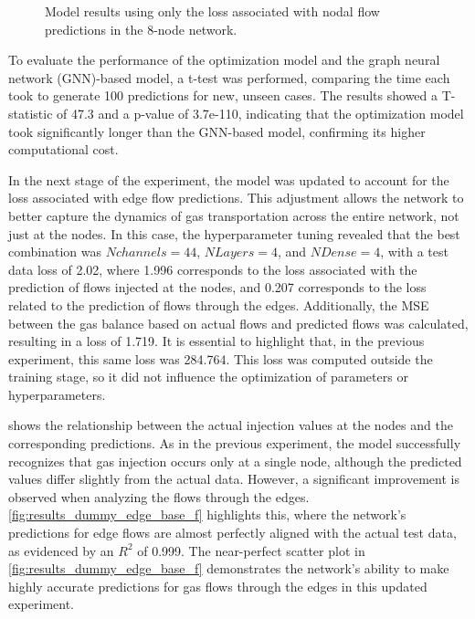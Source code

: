 \begin{figure}
    \centering
    \setlength{}        
    \setlength{} 
    
    \caption{Model results using only the loss associated with nodal flow predictions in the 8-node network.}
    \label{fig:dummy_base_results}
\end{figure}



To evaluate the performance of the optimization model and the graph neural network (GNN)-based model, a t-test was performed, comparing the time each took to generate 100 predictions for new, unseen cases. The results showed a T-statistic of 47.3 and a p-value of 3.7e-110, indicating that the optimization model took significantly longer than the GNN-based model, confirming its higher computational cost.




In the next stage of the experiment, the model was updated to account for the loss associated with edge flow predictions. This adjustment allows the network to better capture the dynamics of gas transportation across the entire network, not just at the nodes. In this case, the hyperparameter tuning revealed that the best combination was $N channels=44$, $N Layers=4$, and $N Dense=4$, with a test data loss of 2.02, where 1.996 corresponds to the loss associated with the prediction of flows injected at the nodes, and 0.207 corresponds to the loss related to the prediction of flows through the edges. Additionally, the MSE between the gas balance based on actual flows and predicted flows was calculated, resulting in a loss of 1.719. It is essential to highlight that, in the previous experiment, this same loss was 284.764. This loss was computed outside the training stage, so it did not influence the optimization of parameters or hyperparameters.


 shows the relationship between the actual injection values at the nodes and the corresponding predictions. As in the previous experiment, the model successfully recognizes that gas injection occurs only at a single node, although the predicted values differ slightly from the actual data. However, a significant improvement is observed when analyzing the flows through the edges. \cref{fig:results_dummy_edge_base_f} highlights this, where the network's predictions for edge flows are almost perfectly aligned with the actual test data, as evidenced by an $R^2$ of 0.999. The near-perfect scatter plot in \cref{fig:results_dummy_edge_base_f} demonstrates the network's ability to make highly accurate predictions for gas flows through the edges in this updated experiment.



